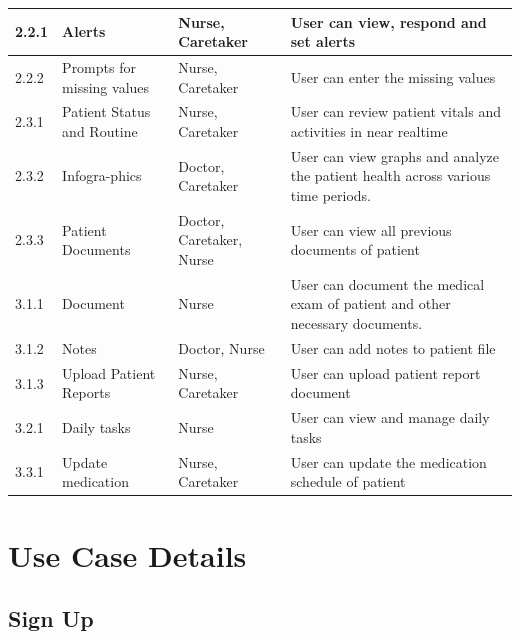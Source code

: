 \begin{longtable}{|p{2cm}|p{2.5cm}|p{2.5cm}|p{5cm}|}
        \hline
        2.2.1 & Alerts  & Nurse, Caretaker & User can view, respond and set  alerts \\
        \hline
        2.2.2 & Prompts for missing values & Nurse, Caretaker & User can enter the missing values\\
        \hline
         2.3.1 & Patient Status and Routine & Nurse, Caretaker& User can review patient vitals and activities in near realtime\\
        \hline
        2.3.2 & Infogra-phics  & Doctor, Caretaker & User can view graphs and analyze the patient health across various time periods.\\
        \hline
        2.3.3 & Patient Documents & Doctor, Caretaker, Nurse & User can view all previous documents of patient\\
        \hline
        3.1.1 & Document & Nurse & User can document the medical exam of patient and other necessary documents.\\
        \hline
         3.1.2 & Notes & Doctor, Nurse & User can add notes to patient file\\
        \hline
         3.1.3 & Upload Patient Reports & Nurse, Caretaker & User can upload patient report document\\
        \hline
        3.2.1 & Daily tasks & Nurse & User can view and manage daily tasks\\
        \hline
        3.3.1 & Update medication & Nurse, Caretaker & User can update the medication schedule of patient\\
        \hline
\end{longtable}
\section{Use Case Details}
\subsection{Sign Up}  

